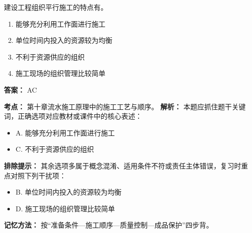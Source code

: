 \documentclass[UTF8,fontset=fandol,11pt]{ctexart}
\begin{document}
\begin{quizbox}[title={第 15 题}]
建设工程组织平行施工的特点有。\\
\begin{enumerate}[label=\Alph*.]
\item 能够充分利用工作面进行施工
\item 单位时间内投入的资源较为均衡
\item 不利于资源供应的组织
\item 施工现场的组织管理比较简单
\end{enumerate}
\textbf{答案：} AC
\vspace{0.25em}
\begin{answerbox}[title={考点解析}]
\textbf{考点：} 第十章流水施工原理中的施工工艺与顺序。
\textbf{解析：} 本题应抓住题干关键词，正确选项对应教材或课件中的核心表述：
\begin{itemize}
\item A. 能够充分利用工作面进行施工
\item C. 不利于资源供应的组织
\end{itemize}
\textbf{排除提示：} 其余选项多属于概念混淆、适用条件不符或责任主体错误，复习时重点对照下列干扰项：
\begin{itemize}
\item B. 单位时间内投入的资源较为均衡
\item D. 施工现场的组织管理比较简单
\end{itemize}
\textbf{记忆方法：} 按“准备条件—施工顺序—质量控制—成品保护”四步背。
\end{answerbox}
\end{quizbox}

\vspace{0.2em}
\end{document}
